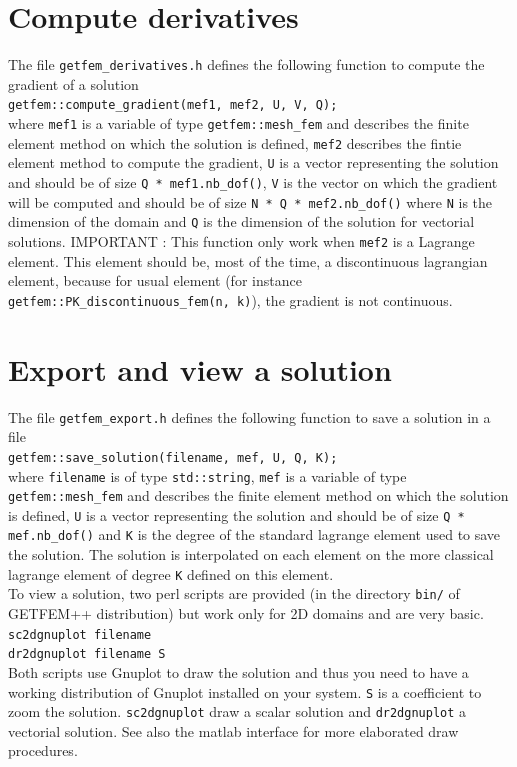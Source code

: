 \documentclass[11pt,a4paper]{article}
\begin{document}
\section{Compute derivatives}

The file {\tt getfem\_derivatives.h}  defines the following function to compute the gradient of a solution\\[0.5cm]
{\tt getfem::compute\_gradient(mef1, mef2, U, V, Q); }\\[0.5cm]
where {\tt mef1} is a variable of type {\tt getfem::mesh\_fem} and describes the finite element method on which the solution is defined, {\tt mef2} describes the fintie element method to compute the gradient, {\tt U} is a vector representing the solution and should be of size {\tt Q * mef1.nb\_dof()}, {\tt V} is the vector on which the gradient will be computed and should be of size
{\tt N * Q * mef2.nb\_dof()} where {\tt N} is the dimension of the domain and {\tt Q} is the dimension of the solution for vectorial solutions. IMPORTANT : This function only work when {\tt mef2} is a Lagrange element. This element should be, most of the time, a discontinuous lagrangian element, because for usual element (for instance {\tt getfem::PK\_discontinuous\_fem(n, k)}), the gradient is not continuous.

\section{Export and view a solution}

The file {\tt getfem\_export.h} defines the following function to save a solution in a file\\[0.5cm]
{\tt getfem::save\_solution(filename, mef, U, Q, K); }\\[0.5cm]
where {\tt filename} is of type {\tt std::string}, {\tt mef}  is a variable of type {\tt getfem::mesh\_fem} and describes the finite element method on which the solution is defined, {\tt U} is a vector representing the solution and should be of size {\tt Q * mef.nb\_dof()} and {\tt K} is the degree of the standard lagrange element used to save the solution. The solution is interpolated on each element on the more classical lagrange element of degree {\tt K} defined on this element.\\[0.5cm]
To view a solution, two perl scripts are provided (in the directory {\tt bin/} of GETFEM++ distribution) but work only for 2D domains and are very basic.\\[0.5cm]
{\tt sc2dgnuplot filename}\\[0.5cm]
{\tt dr2dgnuplot filename S}\\[0.5cm]
Both scripts use Gnuplot to draw the solution and thus you need to have a working distribution of Gnuplot installed on your system. {\tt S} is a coefficient to zoom the solution. {\tt sc2dgnuplot} draw a scalar solution and {\tt dr2dgnuplot} a vectorial solution. See also the matlab interface for more elaborated draw procedures.
\end{document}
